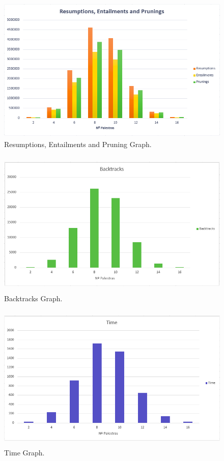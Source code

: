 \documentclass[runningheads,a4paper]{llncs}
\begin{document}
\begin{figure}[!ht]
\centering
\includegraphics[width=11.5cm,height=7cm]{Graph1}
\caption{Resumptions, Entailments and Pruning Graph.}
\label{fig:Graph1}
\end{figure}

\begin{figure}[!ht]
\centering
\includegraphics[width=11.5cm,height=7cm]{Backtracks}
\caption{Backtracks Graph.}
\label{fig:Backtracks}
\end{figure}

\begin{figure}[!ht]
\centering
\includegraphics[width=11.5cm,height=7cm]{Time}
\caption{Time Graph.}
\label{fig:Time Graph}
\end{figure}
\end{document}
